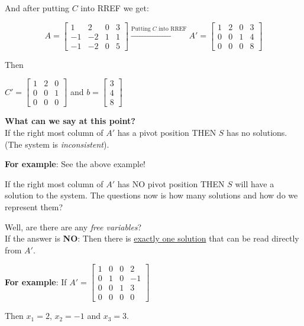 \documentclass[12pt]{article}
\begin{document}
And after putting $C$ into RREF we get:

\[ A= \left[ \begin {array}{ccc|c} 1&2&0&3\\ -1&-2&1&1
\\ -1&-2&0&5\end {array} \right]
\xrightarrow[]{ \text{Putting }C \text{ into RREF} } A' = \left[ \begin {array}{ccc|c} 1&2&0&3\\ 0&0&1&4
\\ 0&0&0&8\end {array} \right] 
\]

Then
\begin{center}
$C'= \left[ \begin {array}{ccc} 1&2&0\\ 0&0&1
\\ 0&0&0\end {array} \right]$ and $b=\left[ \begin {array}{c} 3\\ 4
\\ 8\end {array} \right]$
\end{center}
  

{\bf What can we say at this point?}\\

  If the right most column of $A'$ has a pivot position THEN $S$ has no solutions. (The system is {\it inconsistent}).

{\bf For example}: See the above example! 

 If the right most column of $A'$ has NO pivot position THEN $S$ will have a solution to the system.  The questions now is how many solutions and how do we represent them?

Well, are there are any {\it free variables}?\\


\noindent If the answer is {\bf NO}: Then there is \underline{exactly one solution} that can be read directly from $A'$.

{\bf For example}: 
If $A'= \left[ \begin {array}{ccc|c} 1&0&0&2\\ 0&1&0&-1
\\ 0&0&1&3 \\ 0&0&0&0 \end {array} \right]$

Then $x_1=2$, $x_2=-1$ and $x_3=3$.\\
\end{document}
